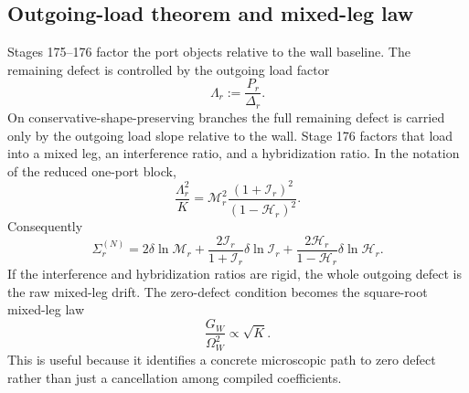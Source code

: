 \subsection{Outgoing-load theorem and mixed-leg law}
Stages 175--176 factor the port objects relative to the wall baseline.  The remaining defect is controlled by the outgoing load factor
\begin{equation}
\label{eq:part05-load-factor-Lambda}
\Lambda_r:=\frac{P_r}{\Delta_r}.
\end{equation}
On conservative-shape-preserving branches the full remaining defect is carried only by the outgoing load slope relative to the wall.  Stage 176 factors that load into a mixed leg, an interference ratio, and a hybridization ratio.  In the notation of the reduced one-port block,
\begin{equation}
\label{eq:part05-load-factor-factorization}
\frac{\Lambda_r^2}{K}
=
\mathcal M_r^2
\frac{(1+\mathcal I_r)^2}{(1-\mathcal H_r)^2}.
\end{equation}
Consequently
\begin{equation}
\label{eq:part05-SigmaN-factorized}
\Sigma_r^{(N)}
=
2\delta\ln\mathcal M_r
+
\frac{2\mathcal I_r}{1+\mathcal I_r}\delta\ln\mathcal I_r
+
\frac{2\mathcal H_r}{1-\mathcal H_r}\delta\ln\mathcal H_r.
\end{equation}
If the interference and hybridization ratios are rigid, the whole outgoing defect is the raw mixed-leg drift.  The zero-defect condition becomes the square-root mixed-leg law
\begin{equation}
\label{eq:part05-square-root-mixed-leg}
\frac{G_W}{\Omega_W^2}\propto\sqrt K.
\end{equation}
This is useful because it identifies a concrete microscopic path to zero defect rather than just a cancellation among compiled coefficients.

